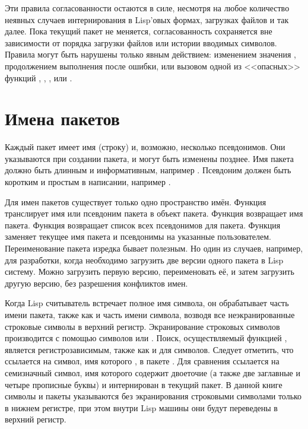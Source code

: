 Эти правила согласованности остаются в силе, несмотря на любое количество неявных
случаев интернирования в Lisp'овых формах, загрузках файлов и так далее. Пока
текущий пакет не меняется, согласованность сохраняется вне зависимости от порядка
загрузки файлов или истории вводимых символов. Правила могут быть нарушены
только явным действием: изменением значения , продолжением
выполнения после ошибки, или вызовом одной из <<опасных>> функций
, , ,  или
.

\section{Имена пакетов}
\label{PACKAGE-NAMES-SECTION}

Каждый пакет имеет имя (строку) и, возможно, несколько псевдонимов. Они
указываются при создании пакета, и могут быть изменены
позднее. Имя пакета должно быть длинным и информативным, например
. Псевдоним должен быть коротким и простым в написании, например
.

Для имен пакетов существует только одно пространство имён. Функция
 транслирует имя или псевдоним пакета в объект
пакета. Функция  возвращает имя пакета. Функция
 возвращает список всех псевдонимов для пакета. Функция
 заменяет текущее имя пакета и псевдонимы на
указанные пользователем. Переименование пакета изредка бывает полезным. Но один
из случаев, например, для разработки, когда необходимо загрузить две версии
одного пакета в Lisp систему. Можно загрузить первую версию, переименовать её, и
затем загрузить другую версию, без разрешения конфликтов имен.

Когда Lisp считыватель встречает полное имя символа, он обрабатывает часть
имени пакета, также как и часть имени символа, возводя все неэкранированные
строковые символы в верхний регистр. Экранирование строковых символов
производится с помощью символов \cd{{\Xbackslash}} или \cd{|}. Поиск,
осуществляемый функцией , является регистрозависимым, также
как и для символов. Следует отметить, что  ссылается на символ,
имя которого , в пакете . Для сравнения  ссылается
на семизначный символ, имя которого содержит двоеточие (а также две заглавные и
четыре прописные буквы) и интернирован в текущий пакет. В данной книге символы и
пакеты указываются без экранирования строковыми символами только в нижнем
регистре, при этом внутри Lisp машины они будут переведены в верхний регистр.


